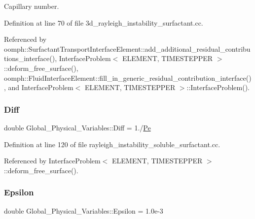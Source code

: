 Capillary number. 



Definition at line 70 of file 3d\+\_\+rayleigh\+\_\+instability\+\_\+surfactant.\+cc.



Referenced by oomph\+::\+Surfactant\+Transport\+Interface\+Element\+::add\+\_\+additional\+\_\+residual\+\_\+contributions\+\_\+interface(), Interface\+Problem$<$ E\+L\+E\+M\+E\+N\+T, T\+I\+M\+E\+S\+T\+E\+P\+P\+E\+R $>$\+::deform\+\_\+free\+\_\+surface(), oomph\+::\+Fluid\+Interface\+Element\+::fill\+\_\+in\+\_\+generic\+\_\+residual\+\_\+contribution\+\_\+interface(), and Interface\+Problem$<$ E\+L\+E\+M\+E\+N\+T, T\+I\+M\+E\+S\+T\+E\+P\+P\+E\+R $>$\+::\+Interface\+Problem().

\mbox{\label{namespaceGlobal__Physical__Variables_a5fdab26ae05957e84318279a47f71bde}} 
\subsubsection{\texorpdfstring{Diff}{Diff}}
{\footnotesize\ttfamily double Global\+\_\+\+Physical\+\_\+\+Variables\+::\+Diff = 1./\hyperlink{namespaceGlobal__Physical__Variables_af252119266d6a28d2111d9d52bf59e87}{Pe}}



Definition at line 120 of file rayleigh\+\_\+instability\+\_\+soluble\+\_\+surfactant.\+cc.



Referenced by Interface\+Problem$<$ E\+L\+E\+M\+E\+N\+T, T\+I\+M\+E\+S\+T\+E\+P\+P\+E\+R $>$\+::deform\+\_\+free\+\_\+surface().

\mbox{\label{namespaceGlobal__Physical__Variables_a28f21de3d342b1dab2fa0be362c6a944}} 
\subsubsection{\texorpdfstring{Epsilon}{Epsilon}}
{\footnotesize\ttfamily double Global\+\_\+\+Physical\+\_\+\+Variables\+::\+Epsilon = 1.\+0e-\/3}



